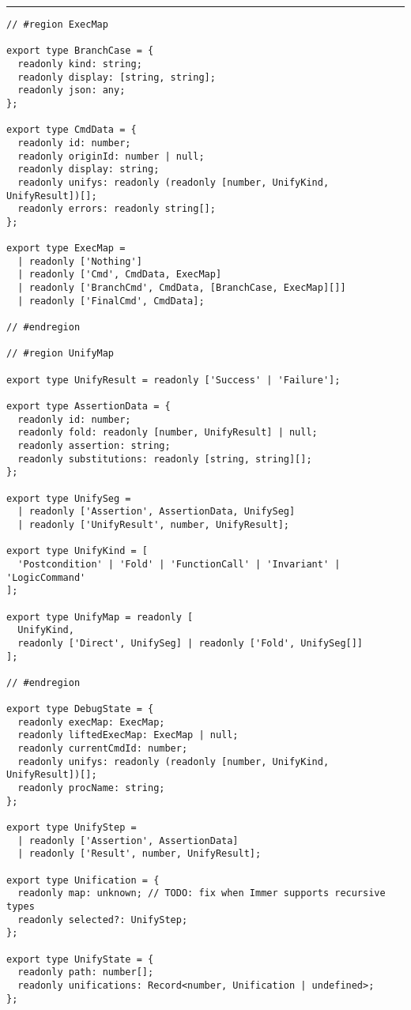 \vspace{2em}
\noindent\rule{\textwidth}{0.5pt}
\vspace{-0.6cm}
\begin{verbatim}
// #region ExecMap

export type BranchCase = {
  readonly kind: string;
  readonly display: [string, string];
  readonly json: any;
};

export type CmdData = {
  readonly id: number;
  readonly originId: number | null;
  readonly display: string;
  readonly unifys: readonly (readonly [number, UnifyKind, UnifyResult])[];
  readonly errors: readonly string[];
};

export type ExecMap =
  | readonly ['Nothing']
  | readonly ['Cmd', CmdData, ExecMap]
  | readonly ['BranchCmd', CmdData, [BranchCase, ExecMap][]]
  | readonly ['FinalCmd', CmdData];

// #endregion

// #region UnifyMap

export type UnifyResult = readonly ['Success' | 'Failure'];

export type AssertionData = {
  readonly id: number;
  readonly fold: readonly [number, UnifyResult] | null;
  readonly assertion: string;
  readonly substitutions: readonly [string, string][];
};

export type UnifySeg =
  | readonly ['Assertion', AssertionData, UnifySeg]
  | readonly ['UnifyResult', number, UnifyResult];

export type UnifyKind = [
  'Postcondition' | 'Fold' | 'FunctionCall' | 'Invariant' | 'LogicCommand'
];

export type UnifyMap = readonly [
  UnifyKind,
  readonly ['Direct', UnifySeg] | readonly ['Fold', UnifySeg[]]
];

// #endregion

export type DebugState = {
  readonly execMap: ExecMap;
  readonly liftedExecMap: ExecMap | null;
  readonly currentCmdId: number;
  readonly unifys: readonly (readonly [number, UnifyKind, UnifyResult])[];
  readonly procName: string;
};

export type UnifyStep =
  | readonly ['Assertion', AssertionData]
  | readonly ['Result', number, UnifyResult];

export type Unification = {
  readonly map: unknown; // TODO: fix when Immer supports recursive types
  readonly selected?: UnifyStep;
};

export type UnifyState = {
  readonly path: number[];
  readonly unifications: Record<number, Unification | undefined>;
};


\end{verbatim}
